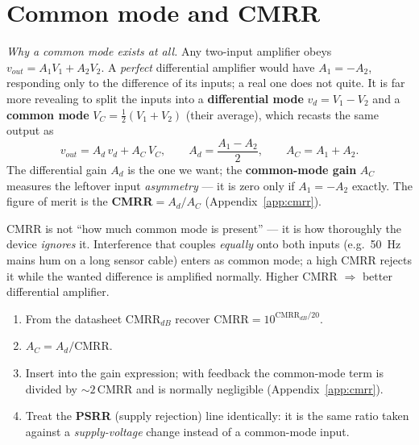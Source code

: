 \documentclass[11pt,a4paper,oneside]{book}
\newcommand{\vd}{v_d}
\newcommand{\Ad}{A_d}
\begin{document}
\section{Common mode and CMRR}
\emph{Why a common mode exists at all.} Any two-input amplifier obeys
$v_{out}=A_1V_1+A_2V_2$. A \emph{perfect} differential amplifier would have
$A_1=-A_2$, responding only to the difference of its inputs; a real one does not
quite. It is far more revealing to split the inputs into a \textbf{differential
mode} $\vd=V_1-V_2$ and a \textbf{common mode} $V_C=\tfrac12(V_1+V_2)$ (their
average), which recasts the same output as
\[
 v_{out}=\Ad\,\vd+A_C\,V_C,\qquad
 \Ad=\frac{A_1-A_2}{2},\qquad A_C=A_1+A_2 .
\]
The differential gain $\Ad$ is the one we want; the \textbf{common-mode gain}
$A_C$ measures the leftover input \emph{asymmetry} --- it is zero only if
$A_1=-A_2$ exactly. The figure of merit is the \textbf{CMRR}$=\Ad/A_C$
(Appendix~\ref{app:cmrr}).

\begin{keyidea}
CMRR is not ``how much common mode is present'' --- it is how thoroughly the device
\emph{ignores} it. Interference that couples \emph{equally} onto both inputs (e.g.\
\qty{50}{\hertz} mains hum on a long sensor cable) enters as common mode; a high
CMRR rejects it while the wanted difference is amplified normally. Higher CMRR
$\Rightarrow$ better differential amplifier.
\end{keyidea}

\begin{protocol}
\begin{enumerate}[leftmargin=1.5cm]
  \item From the datasheet $\text{CMRR}_{dB}$ recover
        $\text{CMRR}=10^{\text{CMRR}_{dB}/20}$.
  \item $A_C=\Ad/\text{CMRR}$.
  \item Insert into the gain expression; with feedback the common-mode term is
        divided by $\sim2\,\text{CMRR}$ and is normally negligible
        (Appendix~\ref{app:cmrr}).
  \item Treat the \textbf{PSRR} (supply rejection) line identically: it is the same
        ratio taken against a \emph{supply-voltage} change instead of a common-mode
        input.
\end{enumerate}
\end{protocol}
\end{document}
